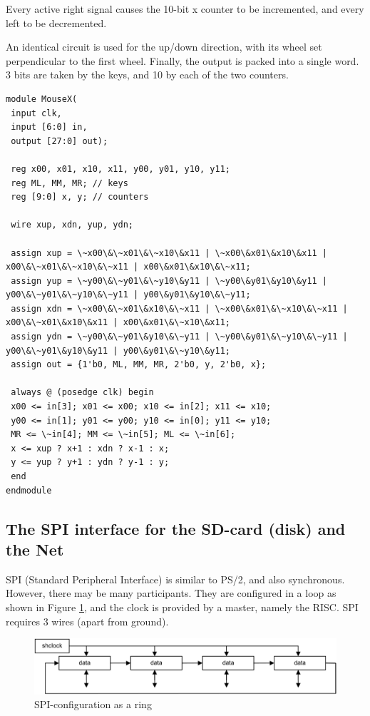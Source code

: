 Every active right signal causes the 10-bit x counter to be incremented, and every left to be
decremented.

An identical circuit is used for the up/down direction, with its wheel set perpendicular to the first
wheel. Finally, the output is packed into a single word. 3 bits are taken by the keys, and 10 by each of
the two counters.
\begin{verbatim}
module MouseX(
 input clk,
 input [6:0] in,
 output [27:0] out);

 reg x00, x01, x10, x11, y00, y01, y10, y11;
 reg ML, MM, MR; // keys
 reg [9:0] x, y; // counters

 wire xup, xdn, yup, ydn;

 assign xup = \~x00\&\~x01\&\~x10\&x11 | \~x00\&x01\&x10\&x11 | x00\&\~x01\&\~x10\&\~x11 | x00\&x01\&x10\&\~x11;
 assign yup = \~y00\&\~y01\&\~y10\&y11 | \~y00\&y01\&y10\&y11 | y00\&\~y01\&\~y10\&\~y11 | y00\&y01\&y10\&\~y11;
 assign xdn = \~x00\&\~x01\&x10\&\~x11 | \~x00\&x01\&\~x10\&\~x11 | x00\&\~x01\&x10\&x11 | x00\&x01\&\~x10\&x11;
 assign ydn = \~y00\&\~y01\&y10\&\~y11 | \~y00\&y01\&\~y10\&\~y11 | y00\&\~y01\&y10\&y11 | y00\&y01\&\~y10\&y11;
 assign out = {1'b0, ML, MM, MR, 2'b0, y, 2'b0, x};

 always @ (posedge clk) begin
 x00 <= in[3]; x01 <= x00; x10 <= in[2]; x11 <= x10;
 y00 <= in[1]; y01 <= y00; y10 <= in[0]; y11 <= y10;
 MR <= \~in[4]; MM <= \~in[5]; ML <= \~in[6];
 x <= xup ? x+1 : xdn ? x-1 : x;
 y <= yup ? y+1 : ydn ? y-1 : y;
 end
endmodule
\end{verbatim}

\subsection{The SPI interface for the SD-card (disk) and the Net}
SPI (Standard Peripheral Interface) is similar to PS/2, and also synchronous. However, there may
be many participants. They are configured in a loop as shown in Figure \ref{fig:ring}, and the clock is
provided by a master, namely the RISC. SPI requires 3 wires (apart from ground).
\begin{figure}[h!]
  \centering
  \includegraphics[width=.9\textwidth]{i/G/6.png}
  \caption{SPI-configuration as a ring}
  \label{fig:ring}
\end{figure}

